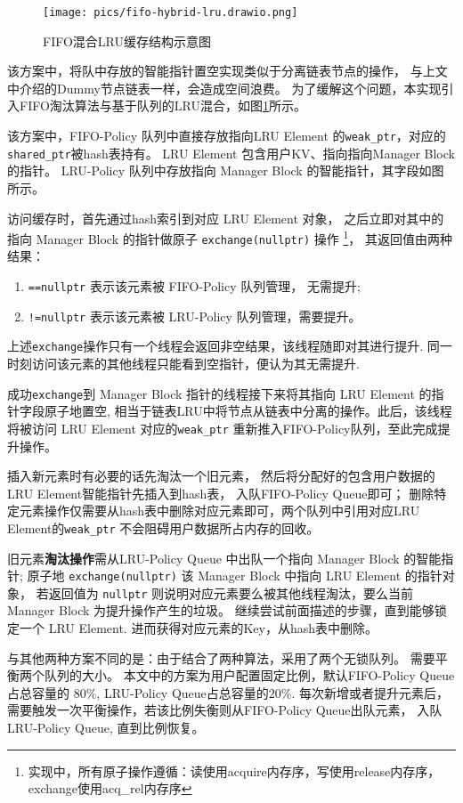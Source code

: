 \begin{figure}
    \centering
    \texttt{[image: pics/fifo-hybrid-lru.drawio.png]}
    \caption{FIFO混合LRU缓存结构示意图}
    \label{fig:fifo-h}
\end{figure}

该方案中，将队中存放的智能指针置空实现类似于分离链表节点的操作，
与上文中介绍的Dummy节点链表一样，会造成空间浪费。
为了缓解这个问题，本实现引入FIFO淘汰算法与基于队列的LRU混合，如图\ref{fig:fifo-h}所示。

该方案中，FIFO-Policy 队列中直接存放指向LRU Element 的\verb|weak_ptr|，对应的\verb|shared_ptr|被hash表持有。
LRU Element 包含用户KV、指向指向Manager Block 的指针。
LRU-Policy 队列中存放指向 Manager Block 的智能指针，其字段如图所示。

访问缓存时，首先通过hash索引到对应 LRU Element 对象，
之后立即对其中的指向 Manager Block 的指针做原子 \verb|exchange(nullptr)| 操作
\footnote{实现中，所有原子操作遵循：读使用acquire内存序，写使用release内存序，exchange使用acq\_rel内存序}，
其返回值由两种结果：
\begin{enumerate}
    \item \verb|==nullptr| 表示该元素被 FIFO-Policy 队列管理， 无需提升;
    \item \verb|!=nullptr| 表示该元素被 LRU-Policy 队列管理，需要提升。
\end{enumerate}
上述\verb|exchange|操作只有一个线程会返回非空结果，该线程随即对其进行提升.
同一时刻访问该元素的其他线程只能看到空指针，便认为其无需提升.

成功\verb|exchange|到 Manager Block 指针的线程接下来将其指向 LRU Element 的指针字段原子地置空,
相当于链表LRU中将节点从链表中分离的操作。此后，该线程将被访问 LRU Element 对应的\verb|weak_ptr|
重新推入FIFO-Policy队列，至此完成提升操作。

插入新元素时有必要的话先淘汰一个旧元素，
然后将分配好的包含用户数据的LRU Element智能指针先插入到hash表，
入队FIFO-Policy Queue即可；
删除特定元素操作仅需要从hash表中删除对应元素即可，两个队列中引用对应LRU Element的\verb|weak_ptr|
不会阻碍用户数据所占内存的回收。

旧元素\textbf{淘汰操作}需从LRU-Policy Queue 中出队一个指向 Manager Block 的智能指针;
原子地 \verb|exchange(nullptr)| 该 Manager Block 中指向 LRU Element 的指针对象，
若返回值为 \verb|nullptr| 则说明对应元素要么被其他线程淘汰，要么当前 Manager Block 为提升操作产生的垃圾。
继续尝试前面描述的步骤，直到能够锁定一个 LRU Element.
进而获得对应元素的Key，从hash表中删除。

与其他两种方案不同的是：由于结合了两种算法，采用了两个无锁队列。
需要平衡两个队列的大小。
本文中的方案为用户配置固定比例，默认FIFO-Policy Queue占总容量的 $80\%$,
LRU-Policy Queue占总容量的$20\%$. 每次新增或者提升元素后，
需要触发一次平衡操作，若该比例失衡则从FIFO-Policy Queue出队元素，
入队LRU-Policy Queue, 直到比例恢复。

